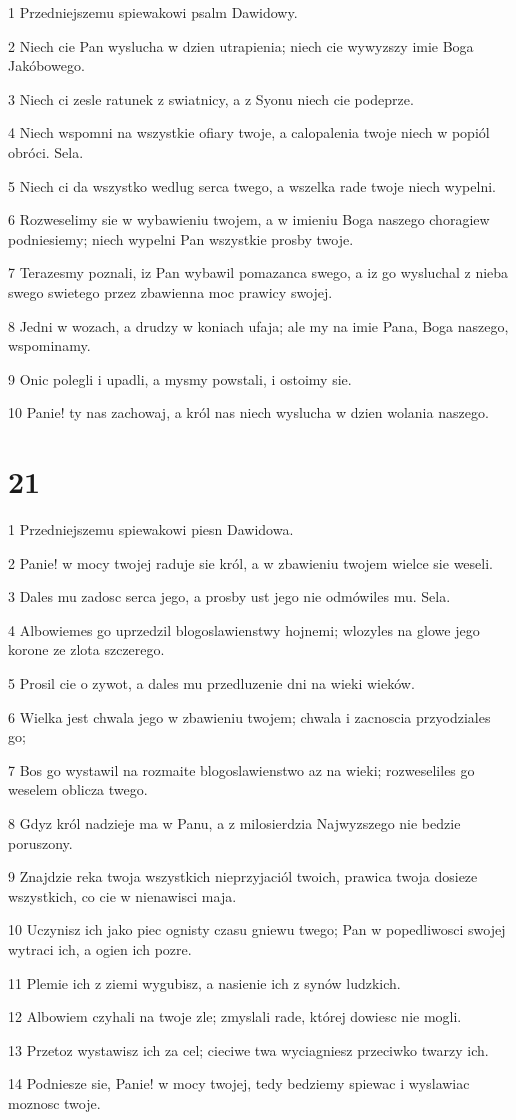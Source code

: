 \par 1 Przedniejszemu spiewakowi psalm Dawidowy.
\par 2 Niech cie Pan wyslucha w dzien utrapienia; niech cie wywyzszy imie Boga Jakóbowego.
\par 3 Niech ci zesle ratunek z swiatnicy, a z Syonu niech cie podeprze.
\par 4 Niech wspomni na wszystkie ofiary twoje, a calopalenia twoje niech w popiól obróci. Sela.
\par 5 Niech ci da wszystko wedlug serca twego, a wszelka rade twoje niech wypelni.
\par 6 Rozweselimy sie w wybawieniu twojem, a w imieniu Boga naszego choragiew podniesiemy; niech wypelni Pan wszystkie prosby twoje.
\par 7 Terazesmy poznali, iz Pan wybawil pomazanca swego, a iz go wysluchal z nieba swego swietego przez zbawienna moc prawicy swojej.
\par 8 Jedni w wozach, a drudzy w koniach ufaja; ale my na imie Pana, Boga naszego, wspominamy.
\par 9 Onic polegli i upadli, a mysmy powstali, i ostoimy sie.
\par 10 Panie! ty nas zachowaj, a król nas niech wyslucha w dzien wolania naszego.

\chapter{21}

\par 1 Przedniejszemu spiewakowi piesn Dawidowa.
\par 2 Panie! w mocy twojej raduje sie król, a w zbawieniu twojem wielce sie weseli.
\par 3 Dales mu zadosc serca jego, a prosby ust jego nie odmówiles mu. Sela.
\par 4 Albowiemes go uprzedzil blogoslawienstwy hojnemi; wlozyles na glowe jego korone ze zlota szczerego.
\par 5 Prosil cie o zywot, a dales mu przedluzenie dni na wieki wieków.
\par 6 Wielka jest chwala jego w zbawieniu twojem; chwala i zacnoscia przyodziales go;
\par 7 Bos go wystawil na rozmaite blogoslawienstwo az na wieki; rozweseliles go weselem oblicza twego.
\par 8 Gdyz król nadzieje ma w Panu, a z milosierdzia Najwyzszego nie bedzie poruszony.
\par 9 Znajdzie reka twoja wszystkich nieprzyjaciól twoich, prawica twoja dosieze wszystkich, co cie w nienawisci maja.
\par 10 Uczynisz ich jako piec ognisty czasu gniewu twego; Pan w popedliwosci swojej wytraci ich, a ogien ich pozre.
\par 11 Plemie ich z ziemi wygubisz, a nasienie ich z synów ludzkich.
\par 12 Albowiem czyhali na twoje zle; zmyslali rade, której dowiesc nie mogli.
\par 13 Przetoz wystawisz ich za cel; cieciwe twa wyciagniesz przeciwko twarzy ich.
\par 14 Podniesze sie, Panie! w mocy twojej, tedy bedziemy spiewac i wyslawiac moznosc twoje.

